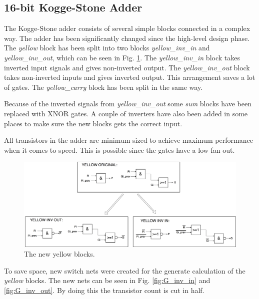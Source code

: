 \subsection{16-bit Kogge-Stone Adder}
The Kogge-Stone adder consists of several simple blocks connected in a complex way. The adder has been significantly changed since the high-level design phase. The \textit{yellow} block has been split into two blocks \textit{yellow\_inv\_in} and \textit{yellow\_inv\_out}, which can be seen in Fig. \ref{fig:yellow_opt}. The \textit{yellow\_inv\_in} block takes inverted input signals and gives non-inverted output. The \textit{yellow\_inv\_out} block takes non-inverted inputs and gives inverted output. This arrangement saves a lot of gates. The \textit{yellow\_carry} block has been split in the same way. 

Because of the inverted signals from \textit{yellow\_inv\_out} some \textit{sum} blocks have been replaced with XNOR gates. A couple of inverters have also been added in some places to make sure the new blocks gets the correct input.

All transistors in the adder are minimum sized to achieve maximum performance when it comes to speed. This is possible since the gates have a low fan out.

\begin{figure}[H]
  \centering
  \captionsetup{justification=centering}
  \includegraphics[scale=0.12]{../figures/yellow_opt}
  \caption{The new yellow blocks.} \label{fig:yellow_opt}
\end{figure}

To save space, new switch nets were created for the generate calculation of the \textit{yellow} blocks. The new nets can be seen in Fig. \ref{fig:G_inv_in} and \ref{fig:G_inv_out}. By doing this the transistor count is cut in half. 

